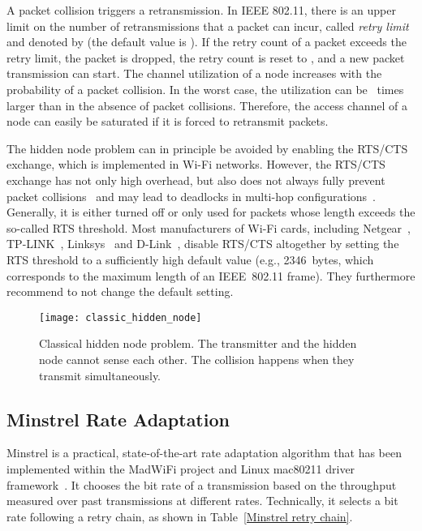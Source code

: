 \documentclass{IEEEtran}
\begin{document}
A packet collision triggers a
retransmission. In IEEE 802.11, there is an upper limit on the number
of retransmissions that a packet can incur, called \textit{retry limit} and
denoted by  (the default value is ). If the retry count  of a packet exceeds the retry
limit, the packet is dropped, the retry count is reset to , and a new packet transmission can start.  The channel utilization of a node increases with the
probability of a packet collision. In the worst case,
the utilization can be~ times larger than in the absence of packet collisions. Therefore, the access channel of
a node can easily be saturated if it is forced to retransmit packets.

The hidden node problem can in principle be avoided by enabling the RTS/CTS exchange,
which is implemented in Wi-Fi networks. However, the RTS/CTS exchange has not only high overhead, but also does not always fully prevent packet
collisions~\cite{ray2005evaluation}
and may lead to deadlocks in multi-hop configurations~\cite{ray2007false}.
Generally, it is either turned off
\cite{bellardo2003802} or only used for packets whose length exceeds the so-called RTS
threshold. Most manufacturers of Wi-Fi cards, including Netgear~\cite{netgear}, TP-LINK~\cite{tp-link}, Linksys~\cite{linksys} and
D-Link~\cite{d-link}, disable RTS/CTS altogether by setting the RTS
threshold to a sufficiently high default value (e.g., 2346~bytes, which corresponds to the maximum length of an IEEE~802.11 frame).
They furthermore recommend to not change the default setting.





\begin{figure}[!t]
\centering
\texttt{[image: classic\_hidden\_node]}
\caption{Classical hidden node problem. The transmitter and the hidden
  node cannot sense each other. The collision happens when they
  transmit simultaneously.}
\label{classic_hidden_node}
\end{figure}





\subsection{Minstrel Rate Adaptation}
\label{Minstrel Rate Adaptation}
Minstrel is a practical, state-of-the-art rate adaptation algorithm that has been
implemented within the MadWiFi project and Linux mac80211
driver framework~\cite{Minstrel}. It chooses the bit rate of a
transmission based on the throughput measured over past transmissions at different rates. Technically, it
selects a bit rate following a retry chain, as shown in
Table~\ref{Minstrel retry chain}.
\end{document}
